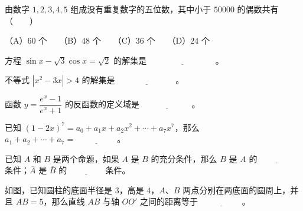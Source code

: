 \begin{question}

由数字 $1,2,3,4,5$ 组成没有重复数字的五位数，其中小于 $50000$ 的偶数共有\mbox{（　　）}

（A）$60$ 个　　（B）$48$ 个　　（C）$36$ 个　　（D）$24$ 个

\end{question}
\begin{question}

方程 $\sin x-\sqrt3\cos x=\sqrt2$ 的解集是 $\underline{\hspace{8em}}$。

\end{question}
\begin{question}

不等式 $|x^2-3x|>4$ 的解集是 $\underline{\hspace{7em}}$。

\end{question}
\begin{question}

函数 $y=\dfrac{e^x-1}{e^x+1}$ 的反函数的定义域是 $\underline{\hspace{6em}}$。

\end{question}
\begin{question}

已知 $(1-2x)^7=a_0+a_1x+a_2x^2+\cdots+a_7x^7$，那么 $a_1+a_2+\cdots+a_7=\underline{\hspace{5em}}$。

\end{question}
\begin{question}

已知 $A$ 和 $B$ 是两个命题，如果 $A$ 是 $B$ 的充分条件，那么 $B$ 是 $A$ 的 $\underline{\hspace{4em}}$ 条件；$\overline A$ 是 $\overline B$ 的 $\underline{\hspace{4em}}$ 条件。

\Needspace{0.4\textheight}
\end{question}
\begin{question}

如图，已知圆柱的底面半径是 $3$，高是 $4$，$A$、$B$ 两点分别在两底面的圆周上，并且 $AB=5$，那么直线 $AB$ 与轴 $OO'$ 之间的距离等于 $\underline{\hspace{5em}}$。
\nopagebreak[4]
\begin{center}\end{center}
\nopagebreak[4]
\end{question}
